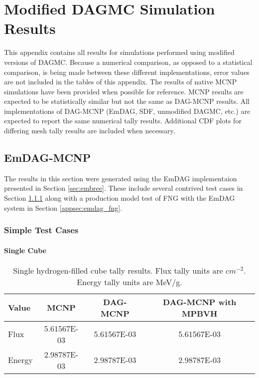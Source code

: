 
\chapter{Modified DAGMC Simulation Results}\label{ch:appendix-b}

This appendix contains all results for simulations performed using modified
versions of DAGMC. Because a numerical comparison, as opposed to a statistical
comparison, is being made between these different implementations, error values
are not included in the tables of this appendix. The results of native MCNP
simulations have been provided when possible for reference. MCNP results are
expected to be statistically similar but not the same as DAG-MCNP results. All
implementations of DAG-MCNP (EmDAG, SDF, unmodified DAGMC, etc.) are expected to
report the same numerical tally results. Additional CDF plots for differing mesh
tally results are included when necessary.

\section{EmDAG-MCNP}

The results in this section were generated using the EmDAG
implementaion presented in Section \ref{sec:embree}. These include several
contrived test cases in Section \ref{appsec:emdag_simple_tests} along with a
production model test of FNG with the EmDAG system in Section \ref{appsec:emdag_fng}.

\subsection{Simple Test Cases}\label{appsec:emdag_simple_tests}
  \subsubsection{Single Cube}

  \begin{table}[H]
    \small
    \begin{center}
      \begin{tabular}{lccc}
        \toprule
        Value & MCNP & DAG-MCNP & DAG-MCNP with MPBVH \\
        \toprule
        \hline
        Flux   & 5.61567E-03 & 5.61567E-03 & 5.61567E-03 \\
        Energy & 2.98787E-03 & 2.98787E-03 & 2.98787E-03 \\
        \bottomrule
      \end{tabular}
      \caption[Single hydrogen-filled cube tally results.]{Single
        hydrogen-filled cube tally results. Flux tally units are
        $cm^{-2}$. Energy tally units are MeV/g.}
      \label{nestedspheres}
    \end{center}
  \end{table}


